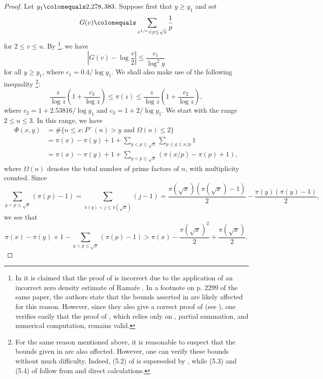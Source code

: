 \documentclass[12pt,reqno]{amsart}
\begin{document}
\begin{proof}
Let $y_1\colonequals2{,}278{,383}$. Suppose first that $y\ge y_1$ and set
\[G(v)\colonequals\sum_{x^{1/v}<p\le \sqrt{x}}\frac{1}{p}\]
for $2\le v\le u$. By \cite[Theorem 5.6]{D}\footnote{In \cite{B} it is claimed that the proof of  \cite[Theorem 4.2]{D} is incorrect due to the application of an incorrect zero density estimate of Rama\'re \cite[Theorem 1.1]{Rama}. In a footnote on p. 2299 of the same paper, the authors state that the bounds asserted in \cite{D} are likely affected for this reason. However, since they also give a correct proof of \cite[Theorem 4.2]{D} (see \cite[Corollary 11.2]{B}), one verifies easily that the proof of \cite[Theorem 5.6]{D}, which relies only on \cite[Theorem 4.2]{D}, partial summation, and numerical computation, remains valid.}, we have
\begin{equation}\label{PropEqu1}
\left|G(v)-\log\frac{v}{2}\right|\le\frac{c_1}{\log^2 y}
\end{equation}
for all $y\ge y_1$, where $c_1=0.4/\log y_1$. We shall also make use of the following inequality \cite[Corollary 5.2]{D}\footnote{For the same reason mentioned above, it is reasonable to suspect that the bounds given in \cite[Corollary 5.2]{D} are also affected. However, one can verify these bounds without much difficulty. Indeed, (5.2) of \cite[Corollary 5.2]{D} is superseded by \cite[Corollary 1]{RS}, while (5.3) and (5.4) of \cite[Corollary 5.2]{D} follow from \cite[Lemmas 3.2--3.4]{BD} and direct calculations.}:
\begin{equation}\label{PropEqu2}
\frac{z}{\log z}\left(1+\frac{c_3}{\log z}\right)\le\pi(z)\le \frac{z}{\log z}\left(1+\frac{c_2}{\log z}\right),
\end{equation} 
where $c_2=1+2.53816/\log y_1$ and $c_3=1+2/\log y_1$. We start with the range $2\le u\le3$. In this range, we have
\begin{align*}
\Phi(x,y)&=\#\{n\le x\colon P^-(n)>y\text{~and~}\Omega(n)\le2\}\\
&=\pi(x)-\pi(y)+1+ \sum_{y<p\leq \sqrt{x}}\sum_{p\le q\le x/p}1\\
&=\pi(x)-\pi(y)+1+ \sum_{y<p\leq \sqrt{x}}(\pi(x/p)-\pi(p)+1),
\end{align*}
where $\Omega(n)$ denotes the total number of prime factors of $n$, with multiplicity counted. 
Since
\[\sum_{y<p\le \sqrt{x}}(\pi(p)-1)=\sum_{\pi(y)<j\le\pi(\sqrt{x})}(j-1)=\frac{\pi(\sqrt{x})(\pi(\sqrt{x})-1)}{2}-\frac{\pi(y)(\pi(y)-1)}{2},\]
we see that
\[\pi(x)-\pi(y)+1-\sum_{y<p\le \sqrt{x}}(\pi(p)-1)>\pi(x)-\frac{\pi(\sqrt{x})^2}{2}+\frac{\pi(\sqrt{x})}{2}.\]

\end{proof}
\end{document}
